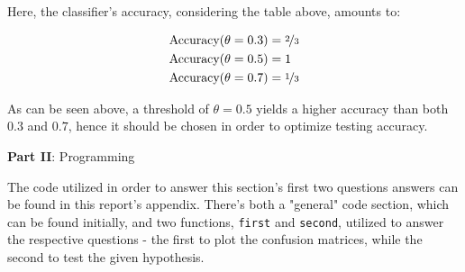 \documentclass[12pt]{article}
\begin{document}
\begin{enumerate}[leftmargin=\labelsep]
  Here, the classifier's accuracy, considering the table above, amounts to:

  \begin{align*}
    \text{Accuracy}(\theta = 0.3) &= \nicefrac{2}{3} \\
    \text{Accuracy}(\theta = 0.5) &= 1 \\
    \text{Accuracy}(\theta = 0.7) &= \nicefrac{1}{3}
  \end{align*}

  As can be seen above, a threshold of $\theta = 0.5$ yields a higher accuracy than
  both $0.3$ and $0.7$, hence it should be chosen in order to optimize testing accuracy.

\end{enumerate}

\pagebreak

\center\large{\textbf{Part II}: Programming}

The code utilized in order to answer this section's first two questions answers
can be found in this report's appendix. There's both a "general" code section,
which can be found initially, and two functions, \texttt{first} and \texttt{second},
utilized to answer the respective questions - the first to plot the confusion matrices,
while the second to test the given hypothesis.
\end{document}
